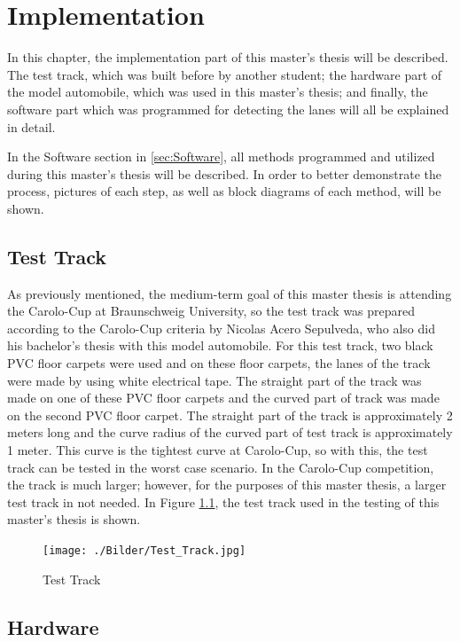 %
\chapter{Implementation}\label{cha:Implementation}
%
In this chapter, the implementation part of this master's thesis will be described. The test track, which was built before by another student; the hardware part of the model automobile, which was used in this master's thesis; and finally, the software part which was programmed for detecting the lanes will all be  explained in detail.

In the Software section in \ref{sec:Software}, all methods programmed and utilized during this master's thesis will be described. In order to better demonstrate the process, pictures of each step, as well as block diagrams of each method, will be shown.

%
\section{Test Track}\label{sec:Test Track}

As previously mentioned, the medium-term goal of this master thesis is attending the Carolo-Cup at Braunschweig University, so the test track was prepared according to the Carolo-Cup criteria by Nicolas Acero Sepulveda, who also did his bachelor's thesis with this model automobile. For this test track, two black PVC floor carpets were used and on these floor carpets, the lanes of the track were made by using white electrical tape. The straight part of the track was made on one of these PVC floor carpets and the curved part of track was made on the second PVC floor carpet. The straight part of the track is approximately 2 meters long and the curve radius of the curved part of test track is approximately 1 meter. This curve is the tightest curve at Carolo-Cup, so with this, the test track can be tested in the worst case scenario. In the Carolo-Cup competition, the track is much larger; however, for the purposes of this master thesis, a larger test track in not needed. In Figure \ref{fig:Test_Track}, the test track used in the testing of this master's thesis is shown.


\begin{figure}[H]
	\centering
		\texttt{[image: ./Bilder/Test\_Track.jpg]}
	\caption{Test Track}
	\label{fig:Test_Track}
\end{figure}



%
\section{Hardware}\label{sec:Hardware}

